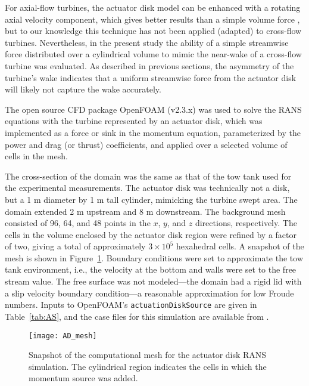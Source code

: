 For axial-flow turbines, the actuator disk model can be enhanced with a rotating
axial velocity component, which gives better results than a simple volume force
\cite{Wu2011}, but to our knowledge this technique has not been applied
(adapted) to cross-flow turbines. Nevertheless, in the present study the
ability of a simple streamwise force distributed over a cylindrical volume to
mimic the near-wake of a cross-flow turbine was evaluated. As described in
previous sections, the asymmetry of the turbine's wake indicates that a uniform
streamwise force from the actuator disk will likely not capture the wake
accurately.

The open source CFD package OpenFOAM (v2.3.x) was used to solve the RANS
equations with the turbine represented by an actuator disk, which was
implemented as a force or sink in the momentum equation, parameterized by the
power and drag (or thrust) coefficients, and applied over a selected volume of
cells in the mesh.

The cross-section of the domain was the same as that of the tow tank used for
the experimental measurements. The actuator disk was technically not a disk, but
a 1 m diameter by 1 m tall cylinder, mimicking the turbine swept area. The
domain extended 2 m upstream and 8 m downstream.  The background mesh consisted
of 96, 64, and 48 points in the $x$, $y$, and $z$ directions, respectively. The
cells in the volume enclosed by the actuator disk region were refined by a
factor of two, giving a total of approximately $3 \times 10^5$ hexahedral cells.
A snapshot of the mesh is shown in Figure~\ref{fig:AD-mesh}. Boundary conditions
were set to approximate the tow tank environment, i.e., the velocity at the
bottom and walls were set to the free stream value. The free surface was not
modeled---the domain had a rigid lid with a slip velocity boundary condition---a
reasonable approximation for low Froude numbers. Inputs to OpenFOAM's
\texttt{actuationDiskSource} are given in Table~\ref{tab:AS}, and the case files
for this simulation are available from \cite{Bachant2014-OF-AS-case-files}.

\begin{figure}
    \centering

    \texttt{[image: AD\_mesh]}

    \caption{Snapshot of the computational mesh for the actuator disk RANS
    simulation. The cylindrical region indicates the cells in which the momentum
    source was added.}

    \label{fig:AD-mesh}
\end{figure}

